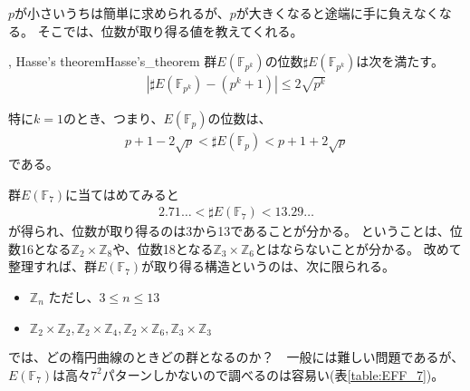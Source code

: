 

$p$が小さいうちは簡単に求められるが、$p$が大きくなると途端に手に負えなくなる。
そこでは、位数が取り得る値を教えてくれる。

\begin{Theo}{, Hasse's theorem}{Hasse's_theorem}
群$E(\mathbb{F}_{p^k})$の位数$\sharp E(\mathbb{F}_{p^k})$は次を満たす。
\begin{align*}
|\sharp E(\mathbb{F}_{p^k}) - (p^k + 1)| \le 2\sqrt{p^k}
\end{align*}
\end{Theo}

特に$k=1$のとき、つまり、$E(\mathbb{F}_{p})$の位数は、
\begin{align*}
p+1-2\sqrt{p} < \sharp E(\mathbb{F}_{p}) < p+1+2\sqrt{p}
\end{align*}
である。

群$E(\mathbb{F}_7)$に当てはめてみると
\begin{align*}
2.71\ldots < \sharp E(\mathbb{F}_7) < 13.29\ldots
\end{align*}
が得られ、位数が取り得るのは3から13であることが分かる。
ということは、位数16となる$\mathbb{Z}_2 \times \mathbb{Z}_8$や、位数18となる$\mathbb{Z}_3 \times \mathbb{Z}_6$とはならないことが分かる。
改めて整理すれば、群$E(\mathbb{F}_7)$が取り得る構造というのは、次に限られる。
\begin{itemize}
 \item $\mathbb{Z}_n$ ただし、$3 \le n \le 13$
 \item $\mathbb{Z}_2 \times \mathbb{Z}_2, \mathbb{Z}_2 \times \mathbb{Z}_4, \mathbb{Z}_2 \times \mathbb{Z}_6, \mathbb{Z}_3 \times \mathbb{Z}_3$
\end{itemize}

では、どの楕円曲線のときどの群となるのか？　一般には難しい問題であるが、$E(\mathbb{F}_7)$は高々$7^2$パターンしかないので調べるのは容易い(表\ref{table:EFF_7})。

